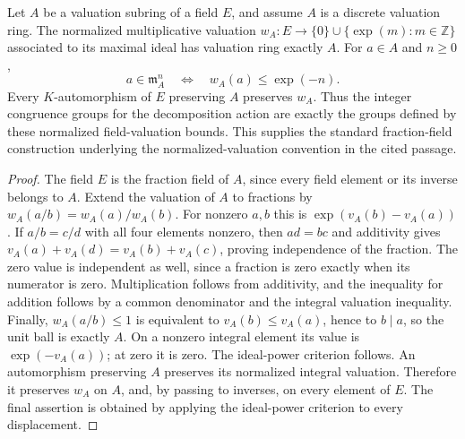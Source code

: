 \begin{lemma}
\label{fw:normalized-field-valuation}
\leanok
Let $A$ be a valuation subring of a field $E$, and assume $A$ is a
discrete valuation ring. The normalized multiplicative valuation
$w_A:E\to\{0\}\cup\{\exp(m):m\in\mathbb Z\}$ associated to its
maximal ideal has valuation ring exactly $A$. For $a\in A$ and
$n\geq0$,
\[
 a\in\mathfrak m_A^n\quad\Longleftrightarrow\quad
 w_A(a)\leq\exp(-n).
\]
Every $K$-automorphism of $E$ preserving $A$ preserves $w_A$.
Thus the integer congruence groups for the decomposition action are
exactly the groups defined by these normalized field-valuation bounds.
This supplies the standard fraction-field construction underlying the
normalized-valuation convention in the cited passage.
\end{lemma}
\begin{proof}
The field $E$ is the fraction field of $A$, since every field element or
its inverse belongs to $A$. Extend the valuation of $A$ to fractions by
$w_A(a/b)=w_A(a)/w_A(b)$. For nonzero $a,b$ this is
$\exp(v_A(b)-v_A(a))$. If $a/b=c/d$ with all four elements nonzero,
then $ad=bc$ and additivity gives
$v_A(a)+v_A(d)=v_A(b)+v_A(c)$, proving independence of the fraction.
The zero value is independent as well, since a fraction is zero exactly
when its numerator is zero. Multiplication follows from additivity,
and the inequality for addition follows by a common denominator and
the integral valuation inequality. Finally, $w_A(a/b)\leq1$ is
equivalent to $v_A(b)\leq v_A(a)$, hence to $b\mid a$, so the unit
ball is exactly $A$.
On a nonzero integral element its value is $\exp(-v_A(a))$;
at zero it is zero. The ideal-power criterion follows.
An automorphism preserving $A$ preserves its normalized integral
valuation. Therefore it preserves $w_A$ on $A$, and, by passing to
inverses, on every element of $E$. The final assertion is obtained by
applying the ideal-power criterion to every displacement.
\end{proof}

